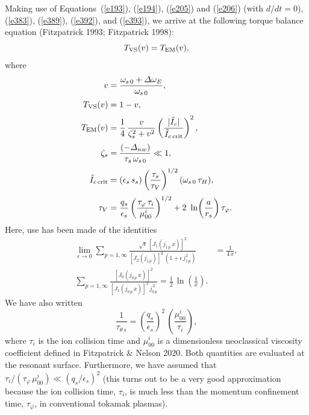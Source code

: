 \documentclass[notitlepage,12pt]{article}
\begin{document}
Making use of Equations~(\ref{e193}), (\ref{e194}), (\ref{e205}) and (\ref{e206}) (with $d/dt=0$), (\ref{e383}), (\ref{e389}), (\ref{e392}),
and (\ref{e393}), we arrive at the following torque balance equation (Fitzpatrick 1993; Fitzpatrick 1998):
\begin{equation}\label{e394}
T_{\rm VS}(v)= T_{\rm EM}(v),
\end{equation}
where 
\begin{align}
v&=\frac{\omega_{s\,0}+{\mit\Delta}\omega_E}{\omega_{s\,0}},\\[0.5ex]
T_{\rm VS}(v) &= 1- v,\\[0.5ex]
T_{\rm EM}(v) &= \frac{1}{4}\,\frac{v}{\zeta_s^{2}+v^2}
\left(\frac{|\tilde{I}_c|}{\tilde{I}_{c\,{\rm crit}}}\right)^2,\\[0.5ex]
\zeta_s &= \frac{(-{\mit\Delta}_{nw})}{\tau_s\,\omega_{s\,0}}\ll 1,\\[0.5ex]
\tilde{I}_{c\,{\rm crit}}&=(\epsilon_s\,s_s)\left(\frac{\tau_s}{\tau_V}\right)^{1/2}(\omega_{s\,0}\,\tau_H), \label{e420}
\\[0.5ex]
\tau_V&= \frac{q_s}{\epsilon_s}\left(\frac{\tau_\varphi\,\tau_i}{\mu_{00}^i}\right)^{1/2}+ 2\ \ln\!\left(\frac{a}{r_s}\right)\tau_\varphi.\label{e421a}
\end{align}
Here, use has been made of the identities
\begin{align}\label{e417a}
\lim_{\epsilon\rightarrow 0}\sum_{p=1,\infty} \frac{\sqrt{\epsilon}\,[J_1(j_{1\,p}\,x)]^{2}}{[J_2(j_{1\,p})]^2\,(1+\epsilon\,j_{1\,p}^2)}
&=\frac{1}{4\,x},\\[0.5ex]
\sum_{p=1,\infty} \frac{[J_0(j_{0\,p}\,x)]^2}{[J_1(j_{0\,p}\,x)]^2\,j_{0\,p}^{\,2}} =\frac{1}{2}\,\ln\!\left(\frac{1}{x}\right).\label{e418a}
\end{align}
We have also written 
\begin{equation}
\frac{1}{\tau_{\theta\,s}} = \left(\frac{q_s}{\epsilon_s}\right)^2\,\left(\frac{\mu_{00}^i}{\tau_{i}}\right),
\end{equation}
 where
$\tau_i$ is the ion collision time and $\mu_{00}^i$ is a dimensionless neoclassical viscosity coefficient defined in Fitzpatrick \& Nelson 2020. Both quantities are evaluated at the resonant surface. Furthermore,
 we have assumed that $\tau_i/(\tau_\varphi\,\mu_{00}^i)\ll (q_s/\epsilon_s)^2$ (this
turns out to be  
a very good approximation because the ion collision time, $\tau_i$, is much less than the momentum confinement
time, $\tau_\varphi$, in conventional tokamak plasmas).  
\end{document}
